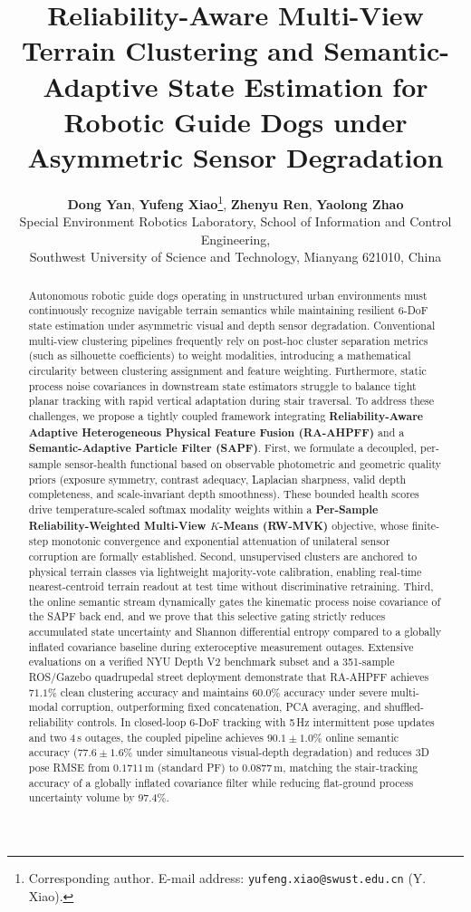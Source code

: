 \documentclass[11pt, a4paper]{article}
\title{\textbf{Reliability-Aware Multi-View Terrain Clustering and Semantic-Adaptive State Estimation for Robotic Guide Dogs under Asymmetric Sensor Degradation}}
\author{
    \textbf{Dong Yan}, \textbf{Yufeng Xiao}\thanks{Corresponding author. E-mail address: \texttt{yufeng.xiao@swust.edu.cn} (Y. Xiao).}, \textbf{Zhenyu Ren}, \textbf{Yaolong Zhao} \\[4pt]
    \small Special Environment Robotics Laboratory, School of Information and Control Engineering, \\
    \small Southwest University of Science and Technology, Mianyang 621010, China
}
\date{}
\begin{document}
\maketitle

\begin{abstract}
\noindent
Autonomous robotic guide dogs operating in unstructured urban environments must continuously recognize navigable terrain semantics while maintaining resilient 6-DoF state estimation under asymmetric visual and depth sensor degradation. Conventional multi-view clustering pipelines frequently rely on post-hoc cluster separation metrics (such as silhouette coefficients) to weight modalities, introducing a mathematical circularity between clustering assignment and feature weighting. Furthermore, static process noise covariances in downstream state estimators struggle to balance tight planar tracking with rapid vertical adaptation during stair traversal. To address these challenges, we propose a tightly coupled framework integrating \textbf{Reliability-Aware Adaptive Heterogeneous Physical Feature Fusion (RA-AHPFF)} and a \textbf{Semantic-Adaptive Particle Filter (SAPF)}. First, we formulate a decoupled, per-sample sensor-health functional based on observable photometric and geometric quality priors (exposure symmetry, contrast adequacy, Laplacian sharpness, valid depth completeness, and scale-invariant depth smoothness). These bounded health scores drive temperature-scaled softmax modality weights within a \textbf{Per-Sample Reliability-Weighted Multi-View $K$-Means (RW-MVK)} objective, whose finite-step monotonic convergence and exponential attenuation of unilateral sensor corruption are formally established. Second, unsupervised clusters are anchored to physical terrain classes via lightweight majority-vote calibration, enabling real-time nearest-centroid terrain readout at test time without discriminative retraining. Third, the online semantic stream dynamically gates the kinematic process noise covariance of the SAPF back end, and we prove that this selective gating strictly reduces accumulated state uncertainty and Shannon differential entropy compared to a globally inflated covariance baseline during exteroceptive measurement outages. Extensive evaluations on a verified NYU Depth V2 benchmark subset and a 351-sample ROS/Gazebo quadrupedal street deployment demonstrate that RA-AHPFF achieves $71.1\%$ clean clustering accuracy and maintains $60.0\%$ accuracy under severe multi-modal corruption, outperforming fixed concatenation, PCA averaging, and shuffled-reliability controls. In closed-loop 6-DoF tracking with 5\,Hz intermittent pose updates and two 4\,s outages, the coupled pipeline achieves $90.1\pm1.0\%$ online semantic accuracy ($77.6\pm1.6\%$ under simultaneous visual-depth degradation) and reduces 3D pose RMSE from $0.1711$\,m (standard PF) to $0.0877$\,m, matching the stair-tracking accuracy of a globally inflated covariance filter while reducing flat-ground process uncertainty volume by $97.4\%$.


\end{abstract}
\end{document}
